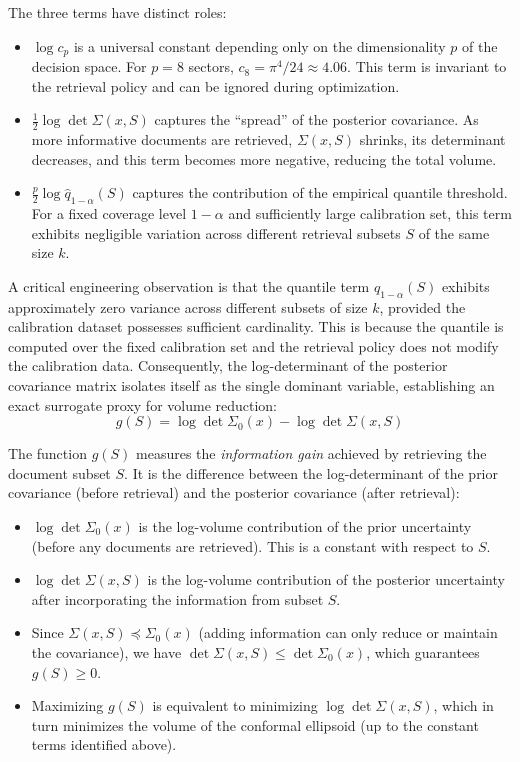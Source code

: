 \documentclass[12pt,a4paper,oneside]{report}
\theoremstyle{definition}
\theoremstyle{remark}
\begin{document}
The three terms have distinct roles:
\begin{itemize}[leftmargin=2em]
  \item $\log c_p$ is a universal constant depending only on the dimensionality $p$ of the decision space. For $p = 8$ sectors, $c_8 = \pi^4/24 \approx 4.06$. This term is invariant to the retrieval policy and can be ignored during optimization.
  \item $\frac{1}{2} \log \det \Sigma(x,S)$ captures the ``spread'' of the posterior covariance. As more informative documents are retrieved, $\Sigma(x,S)$ shrinks, its determinant decreases, and this term becomes more negative, reducing the total volume.
  \item $\frac{p}{2} \log \hat{q}_{1-\alpha}(S)$ captures the contribution of the empirical quantile threshold. For a fixed coverage level $1-\alpha$ and sufficiently large calibration set, this term exhibits negligible variation across different retrieval subsets $S$ of the same size $k$.
\end{itemize}

A critical engineering observation is that the quantile term $\hat{q}_{1-\alpha}(S)$ exhibits approximately zero variance across different subsets of size $k$, provided the calibration dataset possesses sufficient cardinality. This is because the quantile is computed over the fixed calibration set and the retrieval policy does not modify the calibration data. Consequently, the log-determinant of the posterior covariance matrix isolates itself as the single dominant variable, establishing an exact surrogate proxy for volume reduction:
\begin{equation} \label{eq:gain_function}
g(S) = \log \det \Sigma_0(x) - \log \det \Sigma(x, S)
\end{equation}

\medskip
\noindent The function $g(S)$ measures the \emph{information gain} achieved by retrieving the document subset $S$. It is the difference between the log-determinant of the prior covariance (before retrieval) and the posterior covariance (after retrieval):
\begin{itemize}[leftmargin=2em]
  \item $\log \det \Sigma_0(x)$ is the log-volume contribution of the prior uncertainty (before any documents are retrieved). This is a constant with respect to $S$.
  \item $\log \det \Sigma(x,S)$ is the log-volume contribution of the posterior uncertainty after incorporating the information from subset $S$.
  \item Since $\Sigma(x,S) \preceq \Sigma_0(x)$ (adding information can only reduce or maintain the covariance), we have $\det \Sigma(x,S) \leq \det \Sigma_0(x)$, which guarantees $g(S) \geq 0$.
  \item Maximizing $g(S)$ is equivalent to minimizing $\log \det \Sigma(x,S)$, which in turn minimizes the volume of the conformal ellipsoid (up to the constant terms identified above).
\end{itemize}
\end{document}
